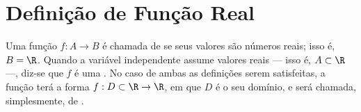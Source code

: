 \section{Definição de Função Real}

\begin{definition}
    Uma função $f: A \to B$ é chamada de  se seus valores são números reais; isso é, $ B = \R$.
    Quando a variável independente assume valores reais --- isso é, $A \subset \R$ ---, diz-se que $f$ é uma .
    No caso de ambas as definições serem satisfeitas, a função terá a forma $f : D \subset \R \to \R$, em que $D$ é o seu domínio, e será chamada, simplesmente, de .
\end{definition}
